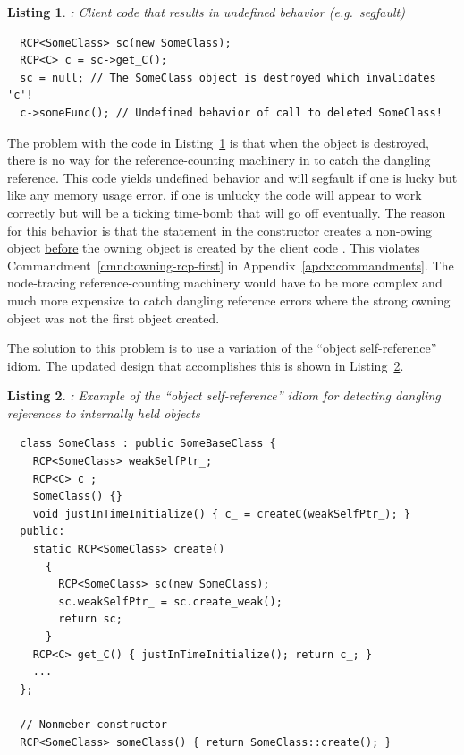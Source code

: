 \documentclass[pdf,ps2pdf,11pt]{SANDreport}
\newtheorem{listing}{Listing}
\begin{document}
{}\begin{listing}: Client code that results in undefined behavior
(e.g.\ segfault) \\
\label{listing:osr:bad-use-SomeClass}
{\small\begin{verbatim}
  RCP<SomeClass> sc(new SomeClass);
  RCP<C> c = sc->get_C();
  sc = null; // The SomeClass object is destroyed which invalidates 'c'!
  c->someFunc(); // Undefined behavior of call to deleted SomeClass!
\end{verbatim}}
\end{listing}


The problem with the code in
Listing~\ref{listing:osr:bad-use-SomeClass} is that when the
{} object {} is destroyed, there is no way for
the reference-counting machinery in to catch the dangling reference.
This code yields undefined behavior and will segfault if one is lucky
but like any memory usage error, if one is unlucky the code will
appear to work correctly but will be a ticking time-bomb that will go
off eventually.  The reason for this behavior is that the statement
{} in the constructor
{} creates a non-owing {} object
{}\underline{before} the owning {} object is created by
the client code {}.  This
violates Commandment~\ref{cmnd:owning-rcp-first} in
Appendix~\ref{apdx:commandments}.  The node-tracing reference-counting
machinery would have to be more complex and much more expensive to
catch dangling reference errors where the strong owning
{} object was not the first {} object
created.

The solution to this problem is to use a variation of the ``object
self-reference'' idiom.  The updated design that accomplishes this is
shown in Listing~\ref{listing:osr:SomeClass-refactored}.


\begin{listing}:  Example of the ``object self-reference'' idiom for
detecting dangling references to internally held objects  \\
\label{listing:osr:SomeClass-refactored}
{\small\begin{verbatim}
  class SomeClass : public SomeBaseClass {
    RCP<SomeClass> weakSelfPtr_;
    RCP<C> c_;
    SomeClass() {}
    void justInTimeInitialize() { c_ = createC(weakSelfPtr_); }
  public:
    static RCP<SomeClass> create()
      {
        RCP<SomeClass> sc(new SomeClass);
        sc.weakSelfPtr_ = sc.create_weak();
        return sc;
      }
    RCP<C> get_C() { justInTimeInitialize(); return c_; }
    ...
  };

  // Nonmeber constructor
  RCP<SomeClass> someClass() { return SomeClass::create(); }
\end{verbatim}}
\end{listing}
\end{document}
